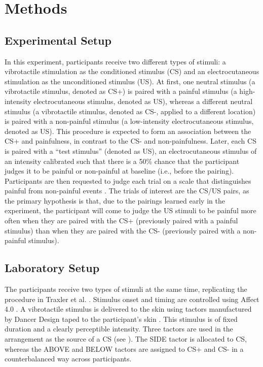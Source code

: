 \documentclass{article}
\begin{document}
\section{Methods}

\subsection{Experimental Setup}

In this experiment, participants receive two different types of stimuli: a vibrotactile stimulation as the conditioned stimulus (CS) and an electrocutaneous stimulation as the unconditioned stimulus (US). At first, one neutral stimulus (a vibrotactile stimulus, denoted as CS+) is paired with a painful stimulus (a high-intensity electrocutaneous stimulus, denoted as US), whereas a different neutral stimulus (a vibrotactile stimulus, denoted as CS-, applied to a different location) is paired with a non-painful stimulus (a low-intensity electrocutaneous stimulus, denoted as US). This procedure is expected to form an association between the CS+ and painfulness, in contrast to the CS- and non-painfulness. Later, each CS is paired with a “test stimulus” (denoted as US), an electrocutaneous stimulus of an intensity calibrated such that there is a 50\% chance that the participant judges it to be painful or non-painful at baseline (i.e., before the pairing). Participants are then requested to judge each trial on a scale that distinguishes painful from non-painful events \autocite{bib40}. The trials of interest are the CS/US pairs, as the primary hypothesis is that, due to the pairings learned early in the experiment, the participant will come to judge the US stimuli to be painful more often when they are paired with the CS+ (previously paired with a painful stimulus) than when they are paired with the CS- (previously paired with a non-painful stimulus).

\subsection{Laboratory Setup}

The participants receive two types of stimuli at the same time, replicating the procedure in Traxler et al. \autocite{bib7}. Stimulus onset and timing are controlled using Affect 4.0 \autocite{bib41}. A vibrotactile stimulus is delivered to the skin using tactors manufactured by Dancer Design taped to the participant's skin \autocite{bib42}. This stimulus is of fixed duration and a clearly perceptible intensity. Three tactors are used in the arrangement as the source of a CS (see \autocite{bibFigure 1}). The SIDE tactor is allocated to CS, whereas the ABOVE and BELOW tactors are assigned to CS+ and CS- in a counterbalanced way across participants.
\end{document}
